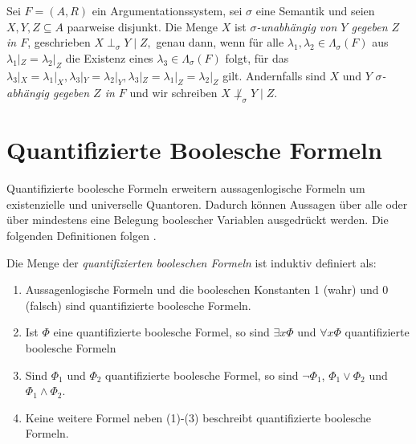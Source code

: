\begin{Definition}
    \label{def:sigma-independence-af}
    Sei \(F =(A,R)\) ein Argumentationssystem, sei \(\sigma\) eine Semantik
    und seien \(X,Y,Z\subseteq A\) paarweise disjunkt. Die Menge \(X\) ist
    \emph{\(\sigma\)-unabhängig von \(Y\) gegeben \(Z\) in \(F\)},
    geschrieben
    \(
        X\perp_\sigma Y\mid Z,
    \)
    genau dann, wenn für alle
    \(\lambda_1,\lambda_2\in\Lambda_\sigma(F)\) aus
    \(\lambda_1|_Z=\lambda_2|_Z\) die Existenz eines
    \(\lambda_3\in\Lambda_\sigma(F)\) folgt, für das
    \(
        \lambda_3|_X=\lambda_1|_X,
        \lambda_3|_Y=\lambda_2|_Y,
        \lambda_3|_Z=\lambda_1|_Z=\lambda_2|_Z
    \)
    gilt. Andernfalls sind \(X\) und \(Y\) \emph{\(\sigma\)-abhängig
    gegeben \(Z\) in \(F\)} und wir schreiben
    \(X\not\perp_\sigma Y\mid Z\).
\end{Definition}

\section{Quantifizierte Boolesche Formeln}
\label{sec:qbf}

Quantifizierte boolesche Formeln erweitern aussagenlogische Formeln um
existenzielle und universelle Quantoren. Dadurch können Aussagen über alle
oder über mindestens eine Belegung boolescher Variablen ausgedrückt werden.
Die folgenden Definitionen folgen \cite{handbook-satisfiability-2nd}.

\begin{Definition}[QBF]
    \label{def:qbf}
    Die Menge der \emph{quantifizierten booleschen Formeln} ist induktiv definiert als:
    \begin{enumerate}
        \item Aussagenlogische Formeln und die booleschen Konstanten 1 (wahr) und 0 (falsch) sind quantifizierte boolesche Formeln.
        \item Ist \(\varPhi\) eine quantifizierte boolesche Formel, so sind \(\exists x \varPhi\) und \(\forall x \varPhi\) quantifizierte boolesche Formeln
        \item Sind \(\varPhi_1\) und \(\varPhi_2\) quantifizierte boolesche Formel, so sind \(\neg \varPhi_1\), \(\varPhi_1 \lor \varPhi_2\) und \(\varPhi_1 \land \varPhi_2\).
        \item Keine weitere Formel neben (1)-(3) beschreibt quantifizierte boolesche Formeln.

    \end{enumerate}
\end{Definition}

